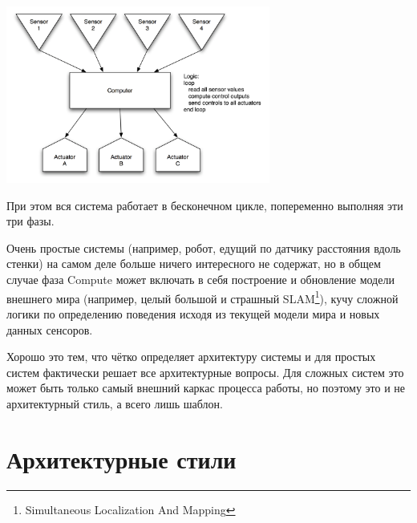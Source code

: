 \documentclass{../../text-style}
\begin{document}
\begin{center}
    \includegraphics[width=0.65\textwidth]{senseComputeControl.png}
\end{center}

При этом вся система работает в бесконечном цикле, попеременно выполняя эти три фазы.

Очень простые системы (например, робот, едущий по датчику расстояния вдоль стенки) на самом деле больше ничего интересного не содержат, но в общем случае фаза Compute может включать в себя построение и обновление модели внешнего мира (например, целый большой и страшный SLAM\footnote{Simultaneous Localization And Mapping}), кучу сложной логики по определению поведения исходя из текущей модели мира и новых данных сенсоров.

Хорошо это тем, что чётко определяет архитектуру системы и для простых систем фактически решает все архитектурные вопросы. Для сложных систем это может быть только самый внешний каркас процесса работы, но поэтому это и не архитектурный стиль, а всего лишь шаблон.

\section{Архитектурные стили}
\end{document}
